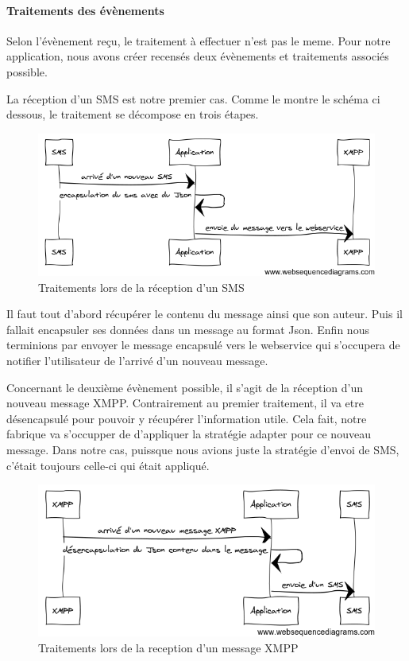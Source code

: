 \paragraph{Traitements des évènements}

Selon l'évènement reçu, le traitement à effectuer n'est pas le meme. Pour notre application, nous avons 
créer recensés deux évènements et traitements associés possible.

La réception d'un SMS est notre premier cas. Comme le montre le schéma ci dessous, le traitement se 
décompose en trois étapes. 

\begin{figure}[!h]
	\center
	\includegraphics[width=12cm]{img/encapsulation-sms.png}
	\caption{Traitements lors de la réception d'un SMS}
\end{figure}

Il faut tout d'abord récupérer le contenu du message ainsi que son auteur. Puis il fallait encapsuler 
ses données dans un message au format Json. Enfin nous terminions par envoyer le message encapsulé vers 
le webservice qui s'occupera de notifier l'utilisateur de l'arrivé d'un nouveau message.

Concernant le deuxième évènement possible, il s'agit de la réception d'un nouveau message XMPP. Contrairement
au premier traitement, il va etre désencapsulé pour pouvoir y récupérer l'information utile. Cela fait, 
notre fabrique va s'occupper de d'appliquer la stratégie adapter pour ce nouveau message. Dans notre cas, 
puissque nous avions juste la stratégie d'envoi de SMS, c'était toujours celle-ci qui était appliqué.


\begin{figure}[!h]
	\center
	\includegraphics[width=12cm]{img/desencapsulation.png}
	\caption{Traitements lors de la reception d'un message XMPP}
\end{figure}
